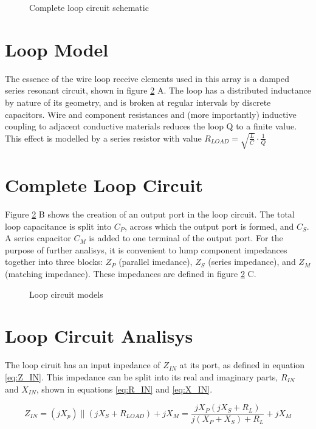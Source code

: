 \begin{figure}
    \centering
    
    \caption{Complete loop circuit schematic}
    \label{fig:loop_schematic}
\end{figure}

\section{Loop Model}
The essence of the wire loop receive elements used in this array is a damped series resonant circuit, shown in figure
\ref{fig:loop_model} A. The loop has a distributed inductance by nature of its geometry, and is broken at regular
intervals by discrete capacitors.  Wire and component resistances and (more importantly) inductive coupling to adjacent
conductive materials reduces the loop Q to a finite value. This effect is modelled by a series resistor with value
$R_{LOAD}=\sqrt{\frac{L}{C}}\cdot\frac{1}{Q}$

\section{Complete Loop Circuit}
Figure \ref{fig:loop_model} B shows the creation of an output port in the loop circuit. The total loop capacitance is
split into $C_P$, across which the output port is formed, and $C_S$. A series capacitor $C_M$ is added to one terminal
of the output port.  For the purpose of further analisys, it is convenient to lump component impedances together into
three blocks: $Z_P$ (parallel imedance), $Z_S$ (series impedance), and $Z_M$ (matching impedance). These impedances are
defined in figure \ref{fig:loop_model} C.

\begin{figure}
    \centering
    
    \caption{Loop circuit models}
    \label{fig:loop_model}
\end{figure}

\section{Loop Circuit Analisys}
The loop ciruit has an input inpedance of $Z_{IN}$ at its port, as defined in equation \ref{eq:Z_IN}. This impedance can
be split into its real and imaginary parts, $R_{IN}$ and $X_{IN}$, shown in equations \ref{eq:R_IN} and \ref{eq:X_IN}.

\begin{equation} \label{eq:Z_IN}
    Z_{IN}=(jX_p)\parallel(jX_S+R_{LOAD})+jX_M = \frac{j X_P (j X_S + R_L)}{j (X_P + X_S) + R_L} + j X_M
\end{equation}


